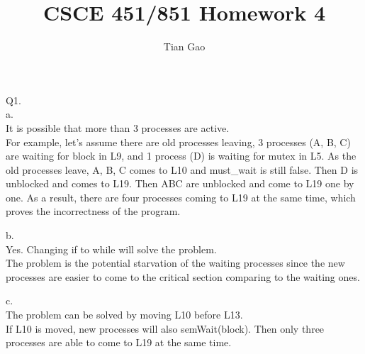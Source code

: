 \documentclass[a4paper, tikz, border=10pt]{article}
\title{CSCE 451/851 Homework 4}
\author{Tian Gao}
\begin{document}
\maketitle

Q1. \\
a.\\
It is possible that more than 3 processes are active.\\
For example, let's assume there are old processes leaving, 3 processes (A, B, C) are waiting for block in L9, and 1 process (D) is waiting for mutex in L5.
As the old processes leave, A, B, C comes to L10 and must\_wait is still false.
Then D is unblocked and comes to L19.
Then ABC are unblocked and come to L19 one by one.
As a result, there are four processes coming to L19 at the same time, which proves the incorrectness of the program.

b.\\
Yes. Changing if to while will solve the problem.\\
The problem is the potential starvation of the waiting processes since the new processes are easier to come to the critical section comparing to the waiting ones.

c.\\
The problem can be solved by moving L10 before L13.\\
If L10 is moved, new processes will also semWait(block). 
Then only three processes are able to come to L19 at the same time.
\end{document}
